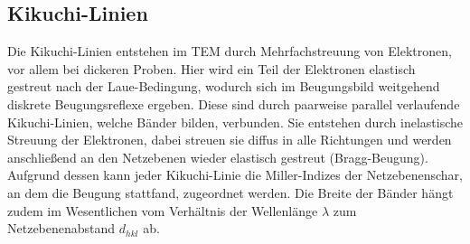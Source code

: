 \subsection{Kikuchi-Linien}
Die Kikuchi-Linien entstehen im TEM durch Mehrfachstreuung von Elektronen, vor allem bei dickeren Proben. Hier wird ein Teil der Elektronen elastisch gestreut nach der Laue-Bedingung, wodurch sich im Beugungsbild weitgehend diskrete Beugungsreflexe ergeben. Diese sind durch paarweise parallel verlaufende Kikuchi-Linien, welche Bänder bilden, verbunden. Sie entstehen durch inelastische Streuung der Elektronen, dabei streuen sie diffus in alle Richtungen und werden anschließend an den Netzebenen wieder elastisch gestreut (Bragg-Beugung).
Aufgrund dessen kann jeder Kikuchi-Linie die Miller-Indizes der Netzebenenschar, an dem die Beugung stattfand, zugeordnet werden. Die Breite der Bänder hängt zudem im Wesentlichen vom Verhältnis der Wellenlänge $\lambda$ zum Netzebenenabstand $d_{hkl}$ ab.